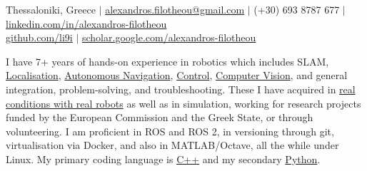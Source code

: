 \documentclass[a4paper,10pt,twoside]{article}
\begin{document}

\par{\bigskip\par}

\begin{center}
{\footnotesize Thessaloniki, Greece $|$ \href{mailto:alexandros.filotheou@gmail.com}{alexandros.filotheou@gmail.com} $|$ (+30) 693 8787 677 $|$ \href{https://www.linkedin.com/in/alexandros-filotheou-5b6a8676/}{linkedin.com/in/alexandros-filotheou} \\ \href{https://github.com/li9i/}{github.com/li9i} $|$  \href{https://scholar.google.com/citations?hl=en&user=9_hI4hMAAAAJ&view_op=list_works}{scholar.google.com/alexandros-filotheou}}
\end{center}

\vspace{-0.5cm}
\begin{bw_box} \small
  \hspace{1em}I have 7+ years of hands-on experience in robotics which includes SLAM, \href{https://github.com/li9i/fsm-lo}{Localisation},
  \href{https://link.springer.com/article/10.1007/s10846-019-01086-y}{Autonomous Navigation}, \href{https://www.tandfonline.com/doi/full/10.1080/00207179.2018.1514129}{Control},
  \href{https://github.com/li9i/pandora\_vision\_2014}{Computer Vision}, and
  general integration, problem-solving, and troubleshooting. These I have acquired in \href{https://relief.web.auth.gr/\%CF\%81\%CE\%BF\%CE\%BC\%CF\%80\%CE\%BF\%CF\%84\%CE\%B9\%CE\%BA\%CE\%AC-\%CE\%BF\%CF\%87\%CE\%AE\%CE\%BC\%CE\%B1\%CF\%84\%CE\%B1/}{real
  conditions with real robots} as well as in simulation, working for research
  projects funded by the European Commission and the Greek State, or through
  volunteering. I am proficient in ROS and ROS 2, in versioning through git, virtualisation via Docker, and also in MATLAB/Octave, all
  the while under Linux. My primary coding language is \href{https://github.com/li9i/fsm}{C++} and my secondary
  \href{https://github.com/cultureid-auth-ros-packages/cultureid-waypoints-following}{Python}.
\end{bw_box}
\end{document}
